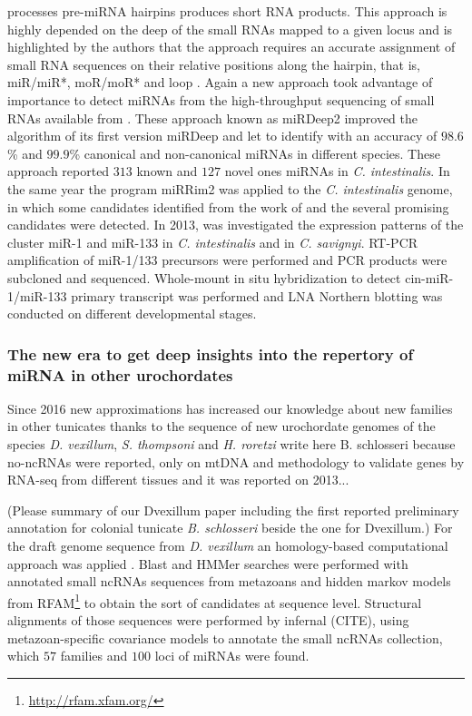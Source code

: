 \documentclass[graybox]{svmult}
\begin{document}
processes pre-miRNA hairpins produces short RNA products. This approach is 
highly depended on the deep of the small RNAs mapped to a given locus and is 
highlighted by the authors that the approach requires an accurate assignment of 
small RNA sequences on their relative positions along the hairpin, that is, 
miR/miR*, moR/moR* and loop \cite{Hendrix2010}. Again a new approach took 
advantage of importance to detect miRNAs from the high-throughput sequencing of 
small RNAs available from \cite{Shi2009}. These approach known as  miRDeep2 
improved the algorithm of its first version miRDeep \cite{Friedlander2012} and 
let to identify with an accuracy of $98.6$\% and $99.9$\% canonical and 
non-canonical miRNAs in different species. These approach reported $313$ known 
and $127$ novel ones miRNAs in \textit{C. intestinalis}. In the same year the 
program miRRim2 \cite{Terai2012} was applied to the \textit{C. intestinalis} 
genome, in which some candidates identified from the work of \cite{Hendrix2010} 
and the several promising candidates were detected. In 2013, \cite{Kusakabe2013} 
was investigated the expression patterns of the cluster miR-1 and miR-133 in 
\textit{C. intestinalis} and in \textit{C. savignyi}. RT-PCR amplification of 
miR-1/133 precursors were performed and PCR products were subcloned and 
sequenced. Whole-mount in situ hybridization to detect cin-miR-1/miR-133 primary 
transcript was performed and LNA Northern blotting was conducted on different 
developmental stages. 

\subsubsection{The new era to get deep insights into the repertory of miRNA in other urochordates}

Since 2016 new approximations has increased our knowledge about new families in 
other tunicates thanks to the sequence of new urochordate genomes of the species 
\textit{D. vexillum}, \textit{S. thompsoni} and \textit{H. roretzi} %
write here B. schlosseri because no-ncRNAs were reported, only on mtDNA and 
methodology to validate genes by RNA-seq from different tissues and it was 
reported on 2013...

(Please summary of our Dvexillum paper \cite{Velandia-Huerto2016} including the 
first reported preliminary annotation for colonial tunicate \textit{B. 
schlosseri} beside the one for Dvexillum.)
For the draft genome sequence from \textit{D. vexillum} an 
homology-based computational approach was applied \cite{Velandia-Huerto2016}. 
Blast and HMMer searches were performed with annotated small ncRNAs sequences 
from metazoans and hidden markov models from 
RFAM\footnote{\url{http://rfam.xfam.org/}} to obtain the sort of candidates at 
sequence level. Structural alignments of those sequences were performed by 
infernal (CITE), using metazoan-specific covariance models to annotate the small 
ncRNAs collection, which $57$ families and $100$ loci of miRNAs were found. 
\end{document}
